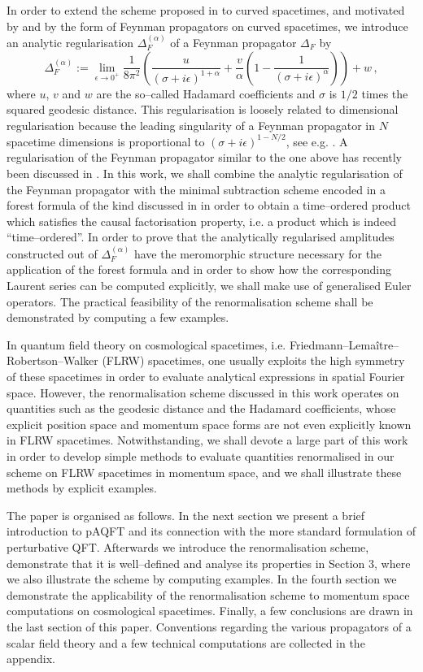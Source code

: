 \documentclass[a4paper,10pt,twoside]{article}
\numberwithin{equation}{section}
\newcounter{and}
\theoremstyle{plain}
\theoremstyle{definition}
\begin{document}
In order to extend the scheme proposed in \cite{dfkr} to curved spacetimes, and motivated by \cite{BolliniGiambiagi} and by the form of Feynman propagators on curved spacetimes, we introduce an analytic regularisation $\Delta^{(\alpha)}_F$ of a Feynman propagator $\Delta_F$ by
\[
\Delta^{(\alpha)}_F := \lim_{\epsilon\to 0^+}\frac{1}{8\pi^2}\left(\frac{u}{(\sigma+i\epsilon )^{1+\alpha}} + \frac{v}{\alpha} \left(1-\frac{1}{(\sigma+i\epsilon )^{\alpha}}\right)\right)+w\,,
\]
where $u$, $v$ and $w$ are the so--called Hadamard coefficients and $\sigma$ is $1/2$ times the squared geodesic distance. This regularisation is loosely related to dimensional regularisation because the leading singularity of a Feynman propagator in $N$ spacetime dimensions is proportional to $(\sigma+i\epsilon)^{1-N/2}$, see e.g. \cite[Appendix A]{Moretti}.  A regularisation of the Feynman propagator similar to the one above has recently been discussed in \cite{Dang}. In this work, we shall combine the analytic regularisation of the Feynman propagator with the minimal subtraction scheme encoded in a forest formula of the kind discussed in \cite{Hollands:2010pr, Keller, dfkr} in order to obtain a time--ordered product which satisfies the causal factorisation property, i.e. a product which is indeed ``time--ordered''. In order to prove that the analytically regularised amplitudes constructed out of $\Delta^{(\alpha)}_F$ have the meromorphic structure necessary for the application of the forest formula and in order to show how the corresponding Laurent series can be computed explicitly, we shall make use of generalised Euler operators.
The practical feasibility of the renormalisation scheme shall be demonstrated by computing a few examples.

In quantum field theory on cosmological spacetimes, i.e. Friedmann--Lema\^itre--Robertson--Walker (FLRW) spacetimes, one usually exploits the high symmetry of these spacetimes in order to evaluate analytical expressions in spatial Fourier space. However, the renormalisation scheme discussed in this work operates on quantities such as the geodesic distance and the Hadamard coefficients, whose explicit position space and momentum space forms are not even explicitly known in FLRW spacetimes. Notwithstanding, we shall devote a large part of this work in order to develop simple methods to evaluate quantities renormalised in our scheme on FLRW spacetimes in momentum space, and we shall illustrate these methods by explicit examples.

The paper is organised as follows. In the next section we present a brief introduction to pAQFT and its connection with the more standard formulation of perturbative QFT. Afterwards we introduce the renormalisation scheme, demonstrate that it is well--defined and analyse its properties in Section 3, where we also illustrate the scheme by computing examples. In the fourth section we demonstrate the applicability of the renormalisation scheme to momentum space computations on cosmological spacetimes. Finally, a few conclusions are drawn in the last section of this paper. Conventions regarding the various propagators of a scalar field theory and a few technical computations are collected in the appendix.
\end{document}
